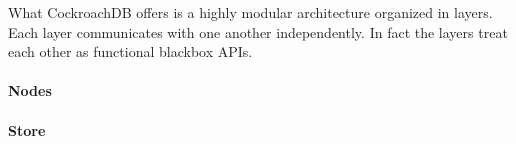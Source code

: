 \documentclass[12pt,a4paper]{article}
\begin{document}
What CockroachDB offers is a highly modular architecture organized in layers. Each layer communicates with one another 
independently. In fact the layers treat each other as functional blackbox APIs.



\paragraph{Nodes}

\paragraph{Store}
\end{document}
